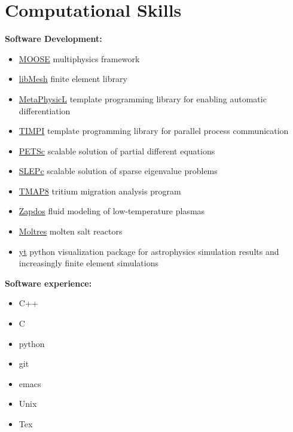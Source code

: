\documentclass[a4paper,10pt]{article} %
\begin{document}
\section{Computational Skills}

\textbf{Software Development:}
\begin{itemize}[noitemsep]
\item \href{https://github.com/idaholab/moose}{MOOSE} multiphysics framework
\item \href{https://github.com/libmesh/libmesh}{libMesh} finite element library
\item \href{https://github.com/libmesh/metaphysicl}{MetaPhysicL} template
  programming library for enabling automatic differentiation
\item \href{https://github.com/libmesh/timpi}{TIMPI} template programming
  library for parallel process communication
\item \href{https://gitlab.com/petsc/petsc}{PETSc} scalable solution of partial
  different equations
\item \href{https://gitlab.com/slepc/slepc}{SLEPc} scalable solution of sparse
  eigenvalue problems
\item \href{https://mooseframework.inl.gov/TMAP8/index.html}{TMAP8} tritium migration analysis program
\item \href{https://github.com/shannon-lab/zapdos}{Zapdos} fluid modeling of low-temperature plasmas
\item \href{https://github.com/arfc/moltres}{Moltres} molten salt reactors
\item \href{https://bitbucket.org/yt/yt\_analysis}{yt} python visualization package for astrophysics simulation results and increasingly finite element simulations
\end{itemize}

\textbf{Software experience:}
\begin{itemize}[noitemsep]
\item C++
\item C
\item python
\item git
\item emacs
\item Unix
\item Tex
\end{itemize}
\end{document}
